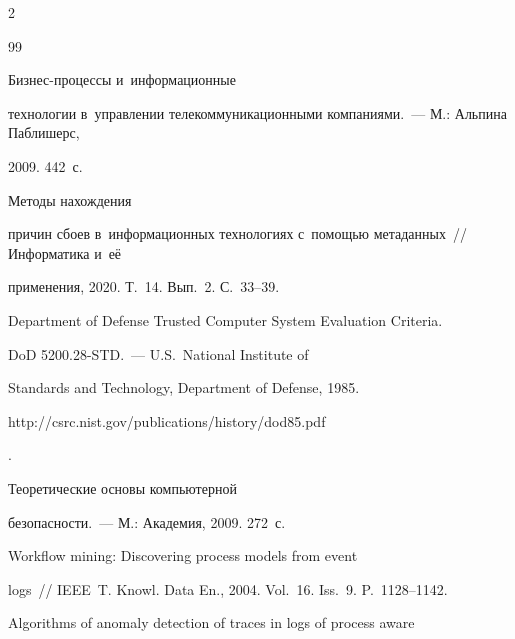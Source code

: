 \begin{multicols}{2}
{{ 


 \begin{thebibliography}{99}







 Биз\-нес-про\-цес\-сы и~информационные 


технологии в~управлении телекоммуникационными компаниями.~--- М.: Альпина Паблишерс, 


2009. 442~с.







 Методы нахождения 


причин сбоев в~информационных технологиях с~помощью метаданных~// Информатика и~её 


применения, 2020. Т.~14. Вып.~2. С.~33--39.


 







Department of Defense Trusted Computer System Evaluation Criteria.


DoD 5200.28-STD.~--- U.S.\ National Institute of 


Standards and Technology, Department of Defense, 1985. {\sf 


http://csrc.nist.gov/\linebreak publications/history/dod85.pdf}.







 Теоретические основы компьютерной 


безопасности.~--- М.: Академия, 2009. 272~с.







 Workflow mining: Discovering process models from event 


logs~// IEEE~T. Knowl. Data En., 2004. Vol.~16. Iss.~9. P.~1128--1142. 




 Algorithms of anomaly detection of traces in logs of process aware 



\end{thebibliography}}}
\end{multicols}
